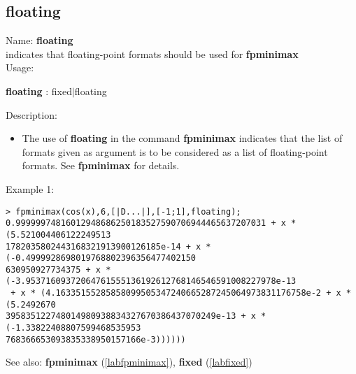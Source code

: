 \subsection{floating}
\label{labfloating}
\noindent Name: \textbf{floating}\\
indicates that floating-point formats should be used for \textbf{fpminimax}\\
\noindent Usage: 
\begin{center}
\textbf{floating} : \textsf{fixed$|$floating}
\\ 
\end{center}
\noindent Description: \begin{itemize}

\item The use of \textbf{floating} in the command \textbf{fpminimax} indicates that the list of
   formats given as argument is to be considered as a list of floating-point
   formats.
   See \textbf{fpminimax} for details.
\end{itemize}
\noindent Example 1: 
\begin{center}\begin{minipage}{15cm}\begin{Verbatim}[frame=single]
> fpminimax(cos(x),6,[|D...|],[-1;1],floating);
0.99999974816012948686250183527590706944465637207031 + x * (5.521004406122249513
1782035802443168321913900126185e-14 + x * (-0.4999928698019768802396356477402150
630950927734375 + x * (-3.95371609372064761555136192612768146546591008227978e-13
 + x * (4.16335155285858099505347240665287245064973831176758e-2 + x * (5.2492670
395835122748014980938834327670386437070249e-13 + x * (-1.33822408807599468535953
768366653093835338950157166e-3))))))
\end{Verbatim}
\end{minipage}\end{center}
See also: \textbf{fpminimax} (\ref{labfpminimax}), \textbf{fixed} (\ref{labfixed})
